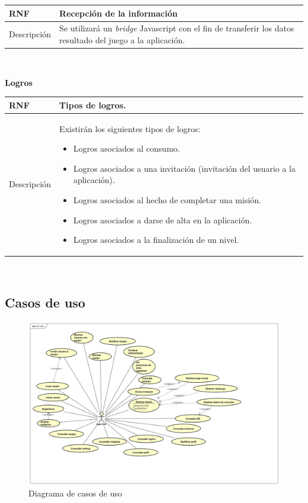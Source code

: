 \documentclass[twoside]{report}
\newcommand\addrow[2]{#1 &#2\\ }
\newcommand\addheading[2]{#1 &#2\\ \hline}
\newcommand\tabularhead{\begin{tabular}{lp{0.7\textwidth}}
\hline
}
\newenvironment{req}{\tabularhead}
{\hline\end{tabular}}
\begin{document}
\begin{req}
	\addheading{\textbf{RNF\arabic{nonFunctionalRequirements}}}{Recepción de la información}
	\addrow{Descripción}{Se utilizará un \textit{bridge} Javascript con el fin de transferir los datos resultado del juego a la aplicación.}
\end{req}\\

\textbf{Logros}\\

\begin{req}
	\addheading{\textbf{RNF\arabic{nonFunctionalRequirements}}}{Tipos de logros.}
	\addrow{Descripción}{Existirán los siguientes tipos de logros:
	\begin{itemize}
	\item Logros asociados al consumo.
	\item Logros asociados a una invitación (invitación del usuario a la aplicación).
	\item Logros asociados al hecho de completar una misión.
	\item Logros asociados a darse de alta en la aplicación.
	\item Logros asociados a la finalización de un nivel.
	\end{itemize}}
\end{req}\\

\subsection{Casos de uso}

\begin{figure}[H]
\begin{center}
\includegraphics[angle=90,scale=0.47]{images/usecase.png}
\caption{Diagrama de casos de uso}
\end{center}
\end{figure}
\end{document}
